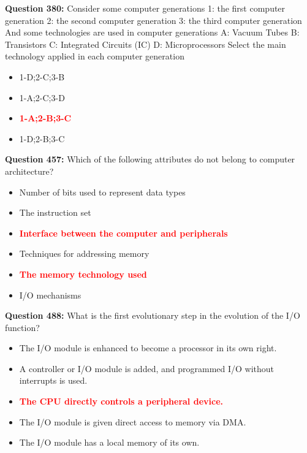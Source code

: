 \documentclass[12pt,a4paper]{article}
\begin{document}
\vspace{0.5cm}

\vspace{0.5cm}

\textbf{Question 380:} Consider some computer generations 1: the first computer generation 2: the second computer generation 3: the third computer generation And some technologies are used in computer generations A: Vacuum Tubes B: Transistors C: Integrated Circuits (IC) D: Microprocessors Select the main technology applied in each computer generation

\begin{itemize}
    \item[\textbf{A.}] 1-D;2-C;3-B
    \item[\textbf{B.}] 1-A;2-C;3-D
    \item[\textbf{C.}] \textcolor{red}{\textbf{1-A;2-B;3-C}}
    \item[\textbf{D.}] 1-D;2-B;3-C
\end{itemize}

\vspace{0.5cm}

\vspace{0.5cm}

\textbf{Question 457:} Which of the following attributes do not belong to computer architecture?

\begin{itemize}
    \item[\textbf{A.}] Number of bits used to represent data types
    \item[\textbf{B.}] The instruction set
    \item[\textbf{C.}] \textcolor{red}{\textbf{Interface between the computer and peripherals}}
    \item[\textbf{D.}] Techniques for addressing memory
    \item[\textbf{E.}] \textcolor{red}{\textbf{The memory technology used}}
    \item[\textbf{F.}] I/O mechanisms
\end{itemize}

\vspace{0.5cm}

\vspace{0.5cm}

\textbf{Question 488:} What is the first evolutionary step in the evolution of the I/O function?

\begin{itemize}
    \item[\textbf{A.}] The I/O module is enhanced to become a processor in its own right.
    \item[\textbf{B.}] A controller or I/O module is added, and programmed I/O without interrupts is used.
    \item[\textbf{C.}] \textcolor{red}{\textbf{The CPU directly controls a peripheral device.}}
    \item[\textbf{D.}] The I/O module is given direct access to memory via DMA.
    \item[\textbf{E.}] The I/O module has a local memory of its own.
\end{itemize}
\end{document}
